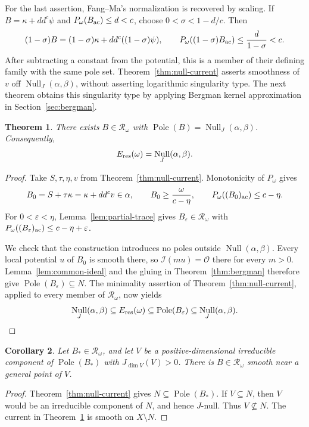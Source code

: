 \documentclass[reqno]{amsart}
\numberwithin{equation}{section}
\newtheorem{theorem}{Theorem}[section]
\newtheorem{corollary}[theorem]{Corollary}
\theoremstyle{definition}
\DeclareMathOperator{\Null}{Null}
\DeclareMathOperator{\Pole}{Pole}
\newcommand{\ddc}{dd^c}
\newcommand{\cO}{\mathcal O}
\begin{document}
For the last assertion, Fang--Ma's normalization is recovered
by scaling. If $B=\kappa+\ddc\psi$ and
$P_\omega(B_{\rm ac})\le d<c$, choose $0<\sigma<1-d/c$. Then
\[
 (1-\sigma)B=(1-\sigma)\kappa+\ddc((1-\sigma)\psi),
 \qquad
 P_\omega((1-\sigma)B_{\rm ac})\le\frac d{1-\sigma}<c.
\]
After subtracting a constant from the potential, this is a
member of their defining family with the same pole set.
Theorem~\ref{thm:null-current} asserts smoothness of $v$ off
$\Null_J(\alpha,\beta)$, without asserting logarithmic singularity type.
The next theorem obtains this singularity type by applying Bergman kernel approximation in Section~\ref{sec:bergman}.

\begin{theorem}\label{thm:null-locus}
There exists $B\in\mathcal R_\omega$ with $\Pole(B)=\Null_J(\alpha,\beta)$.
Consequently,
\begin{equation}\label{eq:null-equality}
 E_{\rm res}(\omega)=\Null_J(\alpha,\beta).
\end{equation}
\end{theorem}
\begin{proof}
Take $S,\tau,\eta,v$ from Theorem~\ref{thm:null-current}.
Monotonicity of $P_\omega$ gives
\[
 B_0=S+\tau\kappa=\kappa+\ddc v\in\alpha,\qquad
 B_0\ge\frac{\omega}{c-\eta},\qquad
 P_\omega((B_0)_{\rm ac})\le c-\eta.
\]
For $0<\varepsilon<\eta$, Lemma~\ref{lem:partial-trace} gives
$B_\varepsilon\in\mathcal R_\omega$ with
$P_\omega((B_\varepsilon)_{\rm ac})\le c-\eta+\varepsilon$.

We check that the construction introduces no poles outside $\Null(\alpha,\beta)$.
Every local potential $u$ of $B_0$ is smooth there, so
$\mathcal I(mu)=\cO$ there for every $m>0$.
Lemma~\ref{lem:common-ideal} and the gluing in
Theorem~\ref{thm:bergman} therefore give
$\Pole(B_\varepsilon)\subseteq N$.
The minimality assertion of Theorem~\ref{thm:null-current},
applied to every member of $\mathcal R_\omega$, now yields
\[
 \Null_J(\alpha,\beta)\subseteq E_{\rm res}(\omega)
 \subseteq\Pole(B_\varepsilon)\subseteq \Null_J(\alpha,\beta).
\]
\end{proof}


\begin{corollary}\label{cor:null-removal}
Let $B_*\in\mathcal R_\omega$, and let $V$ be a
positive-dimensional irreducible component of $\Pole(B_*)$
with $J_{\dim V}(V)>0$. There is $B\in\mathcal R_\omega$
smooth near a general point of $V$.
\end{corollary}
\begin{proof}
Theorem~\ref{thm:null-current} gives $N\subseteq\Pole(B_*)$.
If $V\subseteq N$, then $V$ would be an irreducible component
of $N$, and hence $J$-null. Thus $V\nsubseteq N$.
The current in Theorem~\ref{thm:null-locus} is smooth on
$X\setminus N$.
\end{proof}
\end{document}
